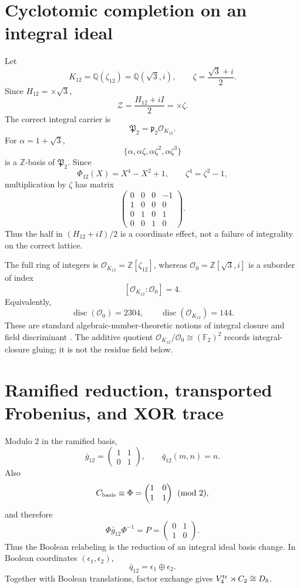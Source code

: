 \documentclass[11pt]{article}
\theoremstyle{remark}
\newcommand{\Q}{\mathbb Q}
\newcommand{\Z}{\mathbb Z}
\newcommand{\F}{\mathbb F}
\newcommand{\OO}{\mathcal O}
\newcommand{\disc}{\operatorname{disc}}
\begin{document}
\section{Cyclotomic completion on an integral ideal}

Let
\[
K_{12}=\Q(\zeta_{12})=\Q(\sqrt3,i),
\qquad
\zeta=\frac{\sqrt3+i}{2}.
\]
Since $H_{12}=\times\sqrt3$,
\[
\boxed{\mathcal Z=\frac{H_{12}+iI}{2}=\times\zeta.}
\]
The correct integral carrier is
\[
\mathfrak P_2=\mathfrak p_2\OO_{K_{12}}.
\]
For $\alpha=1+\sqrt3$,
\[
\{\alpha,\alpha\zeta,\alpha\zeta^2,\alpha\zeta^3\}
\]
is a $\Z$-basis of $\mathfrak P_2$.  Since
\[
\Phi_{12}(X)=X^4-X^2+1,
\qquad \zeta^4=\zeta^2-1,
\]
multiplication by $\zeta$ has matrix
\[
\boxed{
\begin{pmatrix}
0&0&0&-1\\
1&0&0&0\\
0&1&0&1\\
0&0&1&0
\end{pmatrix}.}
\]
Thus the half in $(H_{12}+iI)/2$ is a coordinate effect, not a failure of
integrality on the correct lattice.

The full ring of integers is $\OO_{K_{12}}=\Z[\zeta_{12}]$, whereas
$\OO_0=\Z[\sqrt3,i]$ is a suborder of index
\[
\boxed{[\OO_{K_{12}}:\OO_0]=4.}
\]
Equivalently,
\[
\disc(\OO_0)=2304,
\qquad \disc(\OO_{K_{12}})=144.
\]
These are standard algebraic-number-theoretic notions of integral closure and
field discriminant \cite{Neukirch,Washington}.  The additive quotient
$\OO_{K_{12}}/\OO_0\cong(\F_2)^2$ records integral-closure gluing; it is not
the residue field below.

\section{Ramified reduction, transported Frobenius, and XOR trace}

Modulo $2$ in the ramified basis,
\[
\bar g_{12}
=\begin{pmatrix}1&1\\0&1\end{pmatrix},
\qquad
\bar q_{12}(m,n)=n.
\]
Also
\[
C_{\rm basis}\equiv
\Phi=\begin{pmatrix}1&0\\1&1\end{pmatrix}\pmod2,
\]
and therefore
\[
\Phi\bar g_{12}\Phi^{-1}
=P=\begin{pmatrix}0&1\\1&0\end{pmatrix}.
\]
Thus the Boolean relabeling is the reduction of an integral ideal basis
change.  In Boolean coordinates $(\epsilon_1,\epsilon_2)$,
\[
\bar q_{12}=\epsilon_1\oplus\epsilon_2.
\]
Together with Boolean translations, factor exchange gives
$V_4^{\rm tr}\rtimes C_2\cong D_8$.
\end{document}
